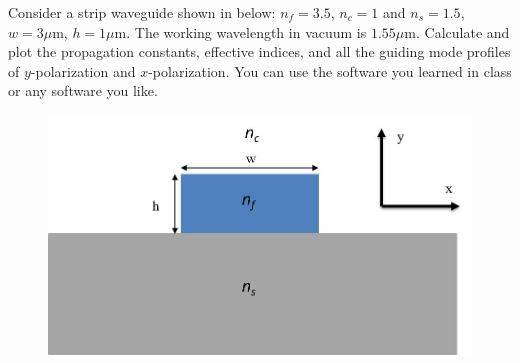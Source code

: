 \documentclass{assignment}
\begin{document}
\begin{prob}
    Consider a strip waveguide shown in below: $n_f=3.5$, $n_c=1$ and $n_s=1.5$, $w=3\mu\mathrm{m}$, $h=1\mu\mathrm{m}$. The working wavelength in vacuum is $1.55\mu\mathrm{m}$. Calculate and plot the propagation constants, effective indices, and all the guiding mode profiles of $y$-polarization and $x$-polarization. You can use the software you learned in class or any software you like.
    \begin{figure}[h]
        \centering
        \includegraphics[width=.5\columnwidth]{A-2.jpg}
    \end{figure}
\end{prob}
\end{document}
